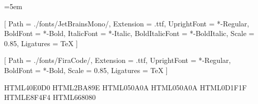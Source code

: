 
\usepackage{fontspec}

\usepackage[dvipsnames, svgnames, x11names, table]{xcolor}
\usepackage[font={color=TextPrimary, small}, labelfont={color=AquaAccent, bf}]{caption}

\usepackage[spanish, es-tabla]{babel}

\usepackage[
    a4paper,
    top=2.5cm, bottom=2.8cm,
    left=2.8cm, right=2.2cm,
    headheight=17pt
]{geometry}

\usepackage{microtype}
\usepackage{ragged2e}
\usepackage{setspace}
\usepackage{parskip}
\usepackage{emptypage}
\usepackage{pagecolor}
\usepackage{afterpage}

\AtBeginDocument{\justifying}
\emergencystretch=5em  
\renewcommand{\baselinestretch}{1.2}

\setmainfont{JetBrainsMono}[
    Path           = ./fonts/JetBrainsMono/,
    Extension      = .ttf,
    UprightFont    = *-Regular,
    BoldFont       = *-Bold,
    ItalicFont     = *-Italic,
    BoldItalicFont = *-BoldItalic,
    Scale          = 0.85,
    Ligatures      = TeX
]

\setmonofont{FiraCode}[
    Path           = ./fonts/FiraCode/,
    Extension      = .ttf,
    UprightFont    = *-Regular,
    BoldFont       = *-Bold,
    Scale          = 0.85,
    Ligatures      = TeX
]

\renewcommand{\familydefault}{\rmdefault}

\definecolor{AquaAccent}  {HTML}{40E0D0}
\definecolor{AquaDim}     {HTML}{2BA89E}
\definecolor{PageBg}      {HTML}{050A0A}
\definecolor{AppDark}     {HTML}{050A0A}
\definecolor{BoxBg}       {HTML}{0D1F1F}
\definecolor{TextPrimary} {HTML}{E8F4F4}
\definecolor{HeadingGray} {HTML}{668080}

\usepackage{graphicx}
\usepackage{float}
\usepackage{booktabs}
\usepackage{tabularx}


\usepackage{tikz}
\usetikzlibrary{babel, positioning, shapes.geometric, arrows.meta, calc}


